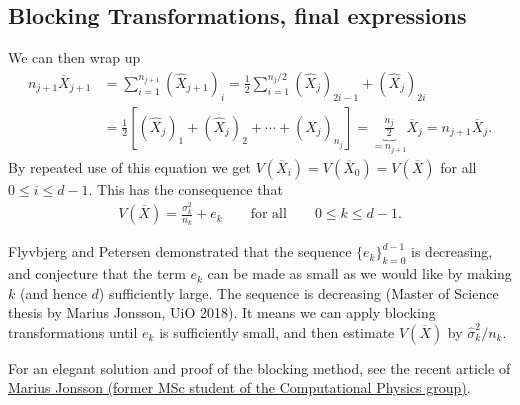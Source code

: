 \subsection*{Blocking Transformations, final expressions}

We can then wrap up
\begin{align}
n_{j+1} \overline{X}_{j+1}  &= \sum_{i=1}^{n_{j+1}} (\hat{X}_{j+1})_i =  \frac{1}{2}\sum_{i=1}^{n_{j}/2} (\hat{X}_{j})_{2i-1} + (\hat{X}_{j})_{2i} \nonumber \\
&= \frac{1}{2}\left[ (\hat{X}_j)_1 + (\hat{X}_j)_2 + \cdots + (\hat{X}_j)_{n_j} \right] = \underbrace{\frac{n_j}{2}}_{=n_{j+1}} \overline{X}_j = n_{j+1}\overline{X}_j. 
\end{align}
By repeated use of this equation we get $V(\overline{X}_i) = V(\overline{X}_0) = V(\overline{X})$ for all $0 \leq i \leq d-1$. This has the consequence that
\begin{align}
V(\overline{X}) = \frac{\sigma_k^2}{n_k} + e_k \qquad \text{for all} \qquad 0 \leq k \leq d-1. \label{eq:convergence}
\end{align}

Flyvbjerg and Petersen demonstrated that the sequence
$\{e_k\}_{k=0}^{d-1}$ is decreasing, and conjecture that the term
$e_k$ can be made as small as we would like by making $k$ (and hence
$d$) sufficiently large. The sequence is decreasing (Master of Science thesis by Marius Jonsson, UiO 2018).
It means we can apply blocking transformations until
$e_k$ is sufficiently small, and then estimate $V(\overline{X})$ by
$\widehat{\sigma}^2_k/n_k$. 

For an elegant solution and proof of the blocking method, see the recent article of \href{{https://journals.aps.org/pre/abstract/10.1103/PhysRevE.98.043304}}{Marius Jonsson (former MSc student of the Computational Physics group)}.
